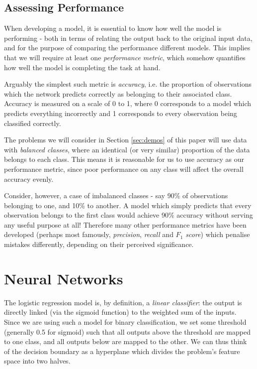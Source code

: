 \documentclass{article}[11pt]
\begin{document}
            
    
    \subsection{Assessing Performance}
        
        When developing a model, it is essential to know how well the model is performing - both in terms of relating the output back to the original input data, and for the purpose of comparing the performance different models. This implies that we will require at least one \textit{performance metric}, which somehow quantifies how well the model is completing the task at hand.
        
        Arguably the simplest such metric is \textit{accuracy}, i.e. the proportion of observations which the network predicts correctly as belonging to their associated class. Accuracy is measured on a scale of 0 to 1, where 0 corresponds to a model which predicts everything incorrectly and 1 corresponds to every observation being classified correctly.
        
        The problems we will consider in Section \ref{sec:demos} of this paper will use data with \textit{balanced classes}, where an identical (or very similar) proportion of the data belongs to each class. This means it is reasonable for us to use accuracy as our performance metric, since poor performance on any class will affect the overall accuracy evenly.
        
        Consider, however, a case of imbalanced classes - say 90\% of observations belonging to one, and 10\% to another. A model which simply predicts that every observation belongs to the first class would achieve 90\% accuracy without serving any useful purpose at all! Therefore many other performance metrics have been developed (perhaps most famously, \textit{precision}, \textit{recall} and \textit{$F_1$ score}) which penalise mistakes differently, depending on their perceived significance.
        


\section{Neural Networks}
    
    The logistic regression model is, by definition, a \textit{linear classifier}: the output is directly linked (via the sigmoid function) to the weighted sum of the inputs. Since we are using such a model for binary classification, we set some threshold (generally 0.5 for sigmoid) such that all outputs above the threshold are mapped to one class, and all outputs below are mapped to the other. We can thus think of the decision boundary as a hyperplane which divides the problem's feature space into two halves.
    
\end{document}
